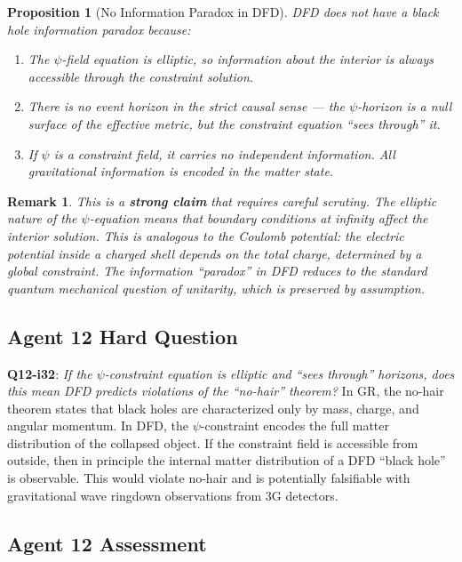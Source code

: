 \documentclass[11pt,a4paper]{article}
\newtheorem{proposition}{Proposition}
\newtheorem{remark}{Remark}
\begin{document}
\begin{proposition}[No Information Paradox in DFD]
DFD does not have a black hole information paradox because:
\begin{enumerate}
\item The $\psi$-field equation is elliptic, so information about the interior is always accessible through the constraint solution.
\item There is no event horizon in the strict causal sense --- the $\psi$-horizon is a null surface of the effective metric, but the constraint equation ``sees through'' it.
\item If $\psi$ is a constraint field, it carries no independent information. All gravitational information is encoded in the matter state.
\end{enumerate}
\end{proposition}

\begin{remark}
This is a \textbf{strong claim} that requires careful scrutiny. The elliptic nature of the $\psi$-equation means that boundary conditions at infinity affect the interior solution. This is analogous to the Coulomb potential: the electric potential inside a charged shell depends on the total charge, determined by a global constraint. The information ``paradox'' in DFD reduces to the standard quantum mechanical question of unitarity, which is preserved by assumption.
\end{remark}

\subsection{Agent 12 Hard Question}

\textbf{Q12-i32}: \emph{If the $\psi$-constraint equation is elliptic and ``sees through'' horizons, does this mean DFD predicts violations of the ``no-hair'' theorem?} In GR, the no-hair theorem states that black holes are characterized only by mass, charge, and angular momentum. In DFD, the $\psi$-constraint encodes the full matter distribution of the collapsed object. If the constraint field is accessible from outside, then in principle the internal matter distribution of a DFD ``black hole'' is observable. This would violate no-hair and is potentially falsifiable with gravitational wave ringdown observations from 3G detectors.

\subsection{Agent 12 Assessment}
\end{document}
